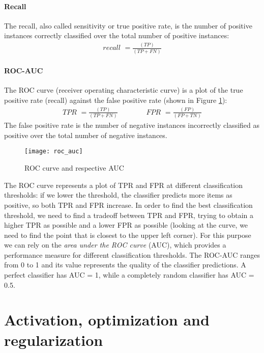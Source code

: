 \paragraph{Recall} The recall, also called sensitivity or true positive rate, is the number of positive instances correctly classified over the total number of positive instances:
\begin{align}
    \textit{recall } = \frac{(TP)}{(TP + FN)}
\end{align}

\paragraph{ROC-AUC} The ROC curve (receiver operating characteristic curve) is a plot of the true positive rate (recall) against the false positive rate (shown in Figure \ref{fig:roc_auc}):
\begin{align}
    \textit{TPR } = \frac{(TP)}{(TP + FN)} \qquad\qquad \textit{FPR } = \frac{(FP)}{(FP + TN)}
\end{align}
The false positive rate is the number of negative instances incorrectly classified as positive over the total number of negative instances.
\begin{figure}[htbp]
    \centering
    \texttt{[image: roc\_auc]}
    \caption{ROC curve and respective AUC}
    \label{fig:roc_auc}
\end{figure}

The ROC curve represents a plot of TPR and FPR at different classification thresholds: if we lower the threshold, the classifier predicts more items as positive, so both TPR and FPR increase. In order to find the best classification threshold, we need to find a tradeoff between TPR and FPR, trying to obtain a higher TPR as possible and a lower FPR as possible (looking at the curve, we need to find the point that is closest to the upper left corner). For this purpose we can rely on the \textit{area under the ROC curve} (AUC), which provides a performance measure for different classification thresholds. The ROC-AUC ranges from 0 to 1 and its value represents the quality of the classifier predictions. A perfect classifier has AUC = 1, while a completely random classifier has AUC = 0.5.


\section{Activation, optimization and regularization} \label{sec: activation_optimization_regularization}
